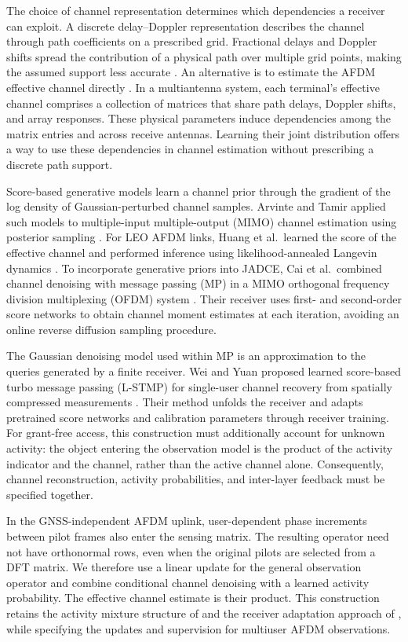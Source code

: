 The choice of channel representation determines which dependencies a
receiver can exploit. A discrete delay--Doppler representation describes
the channel through path coefficients on a prescribed grid. Fractional
delays and Doppler shifts spread the contribution of a physical path
over multiple grid points, making the assumed support less accurate
\cite{shen2025,huang2026}. An alternative is to estimate the AFDM
effective channel directly \cite{huang2026}. In a multiantenna system,
each terminal's effective channel comprises a collection of matrices
that share path delays, Doppler shifts, and array responses. These
physical parameters induce dependencies among the matrix entries and
across receive antennas. Learning their joint distribution offers a way
to use these dependencies in channel estimation without prescribing a
discrete path support.

Score-based generative models learn a channel prior through the gradient
of the log density of Gaussian-perturbed channel samples. Arvinte and
Tamir applied such models to multiple-input multiple-output (MIMO)
channel estimation using posterior sampling \cite{arvinte2023}.
For LEO AFDM links, Huang et al.\ learned the score of the effective
channel and performed inference using likelihood-annealed Langevin
dynamics \cite{huang2026}. To incorporate generative priors into JADCE,
Cai et al.\ combined channel denoising with message passing (MP) in a
MIMO orthogonal frequency division multiplexing (OFDM) system
\cite{cai2026}. Their receiver uses first- and second-order score
networks to obtain channel moment estimates at each iteration, avoiding
an online reverse diffusion sampling procedure.

The Gaussian denoising model used within MP is an approximation to the
queries generated by a finite receiver. Wei and Yuan proposed learned
score-based turbo message passing (L-STMP) for single-user channel
recovery from spatially compressed measurements \cite{wei2026}.
Their method unfolds the receiver and adapts pretrained score networks
and calibration parameters through receiver training. For grant-free
access, this construction must additionally account for unknown
activity: the object entering the observation model is the product of
the activity indicator and the channel, rather than the active channel
alone. Consequently, channel reconstruction, activity probabilities,
and inter-layer feedback must be specified together.

In the GNSS-independent AFDM uplink, user-dependent phase increments
between pilot frames also enter the sensing matrix. The resulting
operator need not have orthonormal rows, even when the original pilots
are selected from a DFT matrix. We therefore use a linear update for
the general observation operator and combine conditional channel
denoising with a learned activity probability. The effective channel
estimate is their product. This construction retains the activity
mixture structure of \cite{cai2026} and the receiver adaptation approach
of \cite{wei2026}, while specifying the updates and supervision for
multiuser AFDM observations.

